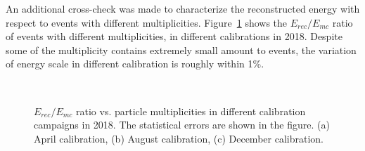 An additional cross-check was made to characterize the reconstructed energy with respect to events with different multiplicities. 
Figure~\ref{fig:EvsMulti} shows the $E_{rec}/E_{mc}$ ratio of events with different multiplicities, in different calibrations in 2018.
Despite some of the multiplicity contains extremely small amount to events, the variation of energy scale in different calibration is roughly within 1\%.

\begin{figure}[h!]
\centering
{}\quad
{} \\
\caption[$E_{rec}/E_{mc}$ ratio vs. particle multiplicities]{$E_{rec}/E_{mc}$ ratio vs. particle multiplicities in different calibration campaigns in 2018. The statistical errors are shown in the figure. (a) April calibration, (b) August calibration, (c) December calibration.
}
\label{fig:EvsMulti}
\end{figure}


